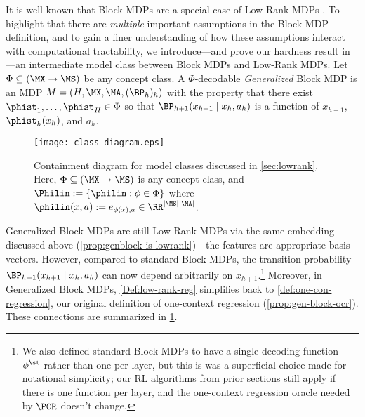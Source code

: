  It is well known that Block MDPs are a special case of Low-Rank MDPs \citep{modi2021model,zhang2022efficient}. To highlight that there are \emph{multiple} important assumptions in the Block MDP definition, and to gain a finer understanding of how these assumptions interact with computational tractability, we introduce---and prove our hardness result in---an intermediate model class between Block MDPs and Low-Rank MDPs. Let $\Phi \subseteq (\MX\to\MS)$ be any concept class. A $\Phi$-decodable \emph{Generalized} Block MDP is an MDP $M = (H, \MX,\MA,(\BP_h)_h)$ with the property that there exist $\phist_1,\dots,\phist_H \in \Phi$ so that $\BP_{h+1}(x_{h+1}\mid{}x_h,a_h)$ is a function of $x_{h+1}$, $\phist_h(x_h)$, and $a_h$.


\begin{figure}[t]
\centering
\texttt{[image: class\_diagram.eps]}
\caption{Containment diagram for model classes discussed in \cref{sec:lowrank}. Here, $\Phi \subseteq (\MX\to\MS)$ is any concept class, and $\Philin := \{\philin:\phi\in\Phi\}$ where $\philin(x,a) := e_{\phi(x),a}\in\RR^{|\MS||\MA|}$.}\label{fig:classes}
\end{figure}

Generalized Block MDPs are still Low-Rank MDPs via the same embedding discussed above (\cref{prop:genblock-is-lowrank})---the features are appropriate basis vectors. However, compared to standard Block MDPs, the transition probability $\BP_{h+1}(x_{h+1}\mid{}x_h,a_h)$ can now depend arbitrarily on $x_{h+1}$.\footnote{We also defined standard Block MDPs to have a single decoding function $\phi^\st$ rather than one per layer, but this is was a superficial choice made for notational simplicity; our RL algorithms from prior sections still apply if there is one function per layer, and the one-context regression oracle needed by $\PCR$ doesn't change.} Moreover, in Generalized Block MDPs, \cref{Def:low-rank-reg} simplifies back to \cref{def:one-con-regression}, our original definition of one-context regression (\cref{prop:gen-block-ocr}). These connections are summarized in \cref{fig:classes}. 

